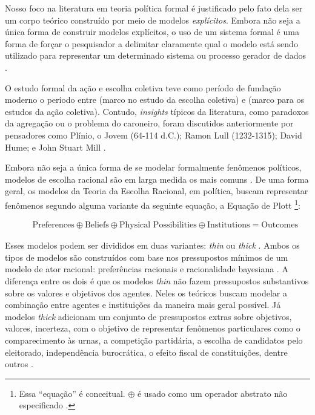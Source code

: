 Nosso foco na
literatura em teoria política formal é justificado pelo fato dela ser um corpo
teórico construído por meio de modelos
\textit{explícitos}\cite{epstein2008model}. Embora não seja a única forma de
construir modelos explícitos, o uso de um sistema formal é uma forma de forçar o
pesquisador a delimitar claramente qual o modelo está sendo utilizado para
representar um determinado sistema ou processo gerador de dados
\cite{morton1999methods, smaldino2017models}.

O estudo formal da ação e escolha coletiva teve como período de fundação moderno
o período entre  (marco no estudo da escolha
coletiva) e  (marco para os estudos da ação
coletiva). Contudo, \textit{insights} típicos da literatura, como paradoxos da
agregação ou o problema do caroneiro, foram discutidos anteriormente por
pensadores como Plínio, o Jovem (64-114 d.C.); Ramon Lull (1232-1315); David
Hume; e John Stuart Mill \cite{mclean2015strange, sep-free-rider,
  ordeshook1990emerging}.


Embora não seja a única forma de se modelar formalmente fenômenos políticos,
modelos de escolha racional são em larga medida os mais comuns
\cite{austen1998social}. De uma forma geral, os modelos da Teoria da Escolha
Racional, em política, buscam representar fenômenos segundo alguma variante da
seguinte equação, a Equação de Plott \cite{munger2015choosing,
  ostrom1986agenda}\footnote{Essa ``equação'' é conceitual. \(\oplus\) é usado como
  um operador abstrato não especificado \cite{ostrom1986agenda}. }:
\begin{figure}[H]
\begin{align*}
  \text{Preferences} \oplus \text{Beliefs}  \oplus  \text{Physical Possibilities} \oplus \text{Institutions} = \text{Outcomes}
\end{align*}
\end{figure}
Esses modelos podem ser divididos em duas variantes: \textit{thin} ou
\textit{thick} \cite{hechter1997sociological, green1996pathologies}. Ambos os
tipos de modelos são construídos com base nos pressupostos mínimos de um modelo
de ator racional: preferências racionais e racionalidade bayesiana
\cite{gintis2016individuality}. A diferença entre os dois é que os modelos
\textit{thin} não fazem pressupostos substantivos sobre os valores e objetivos
dos agentes. Neles os teóricos buscam modelar a combinação entre agentes e
instituições da maneira mais geral possível. Já modelos \textit{thick} adicionam
um conjunto de pressupostos extras sobre objetivos, valores, incerteza, com o
objetivo de representar fenômenos particulares como o comparecimento às urnas, a
competição partidária, a escolha de candidatos pelo eleitorado, independência
burocrática, o efeito fiscal de constituições, dentre outros
\cite{bendor2011behavioral}.

